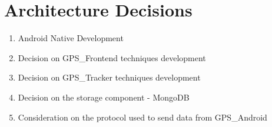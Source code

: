 
\section{Architecture Decisions}\label{architecture-decisions}

\begin{enumerate}
\def\labelenumi{\arabic{enumi}.}
\tightlist
\item
	Android Native Development
\item
	Decision on GPS\_Frontend techniques development
\item
	Decision on GPS\_Tracker techniques development
\item
	Decision on the storage component - MongoDB
\item
	Consideration on the protocol used to send data from GPS\_Android
\end{enumerate}
